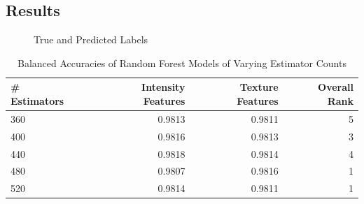 \documentclass[11pt]{article}
\begin{document}
\subsection{Results}
\begin{figure}[H]
    \centering
    {
        {
        }
        {
        }
    }\caption{True and Predicted Labels}
    \label{fig:labels}
\end{figure}

\begin{table}[H]
    \centering
    \begin{tabular}{llrrr}
        \toprule
        \# Estimators & & Intensity Features & Texture Features & Overall Rank \\
        \midrule
        \textsc{360} & & 0.9813 & 0.9811 & 5 \\
        \textsc{400} & & 0.9816 & 0.9813 & 3 \\
        \textsc{440} & & 0.9818 & 0.9814 & 4 \\
        \textsc{480} & & 0.9807 & 0.9816 & 1 \\
        \textsc{520} & & 0.9814 & 0.9811 & 1 \\
        \bottomrule
    \end{tabular}
    \caption{\label{tab:rf_search_results} Balanced Accuracies of Random Forest Models of Varying Estimator Counts}
\end{table}
    
\end{document}
